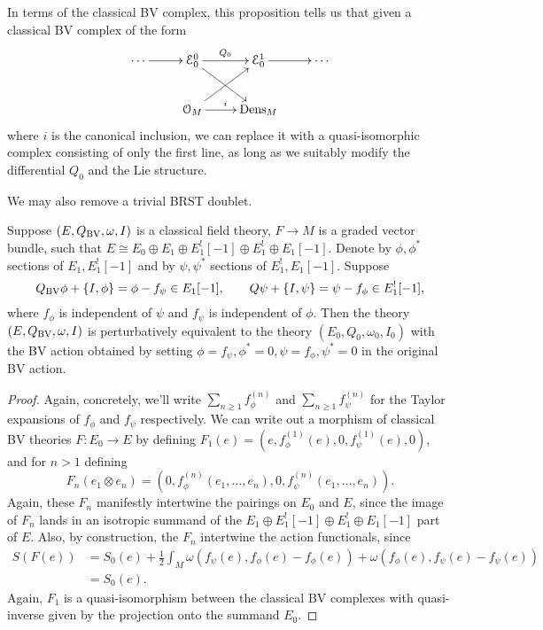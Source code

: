 \documentclass[10pt, oneside]{article}
\begin{document}
\begin{remark}
In terms of the classical BV complex, this proposition tells us that given a classical BV complex of the form
\[\xymatrix{
\cdots \ar[r] &\mc E_0^0 \ar[r]^{Q_0} \ar[dr] &\mc E_0^1 \ar[r] &\cdots \\
&\cO_M \ar^{i}[r] \ar[ur] &\dens_M &
}\]
where $i$ is the canonical inclusion, we can replace it with a quasi-isomorphic complex consisting of only the first line, as long as we suitably modify the differential $Q_0$ and the Lie structure.
\end{remark}

We may also remove a trivial BRST doublet.

\begin{prop}
Suppose $(E, Q_{\mathrm{BV}}, \omega, I)$ is a classical field theory, $F\rightarrow M$ is a graded vector bundle, such that $E\cong E_0\oplus E_1\oplus E_1^![-1]\oplus E_1^!\oplus E_1[-1]$. Denote by $\phi, \phi^*$ sections of $E_1,E_1^![-1]$ and by $\psi, \psi^*$ sections of $E_1^!, E_1[-1]$. Suppose
\[Q_{\mathrm{BV}}\phi + \{I, \phi\} = \phi - f_\psi \in E_1[-1] ,\qquad Q\psi + \{I, \psi\} = \psi - f_{\phi} \in E_1^![-1],\]
where $f_\phi$ is independent of $\psi$ and $f_{\psi}$ is independent of $\phi$. Then the theory $(E, Q_{\mathrm{BV}}, \omega, I)$ is perturbatively equivalent to the theory $(E_0, Q_0, \omega_0, I_0)$ with the BV action obtained by setting $\phi = f_\psi, \phi^* = 0,  \psi = f_\phi, \psi^* = 0$ in the original BV action.
\label{prop:BRSTdoublet}
\end{prop}

\begin{proof}
Again, concretely, we'll write $\sum_{n \ge 1} f^{(n)}_\phi$ and $\sum_{n \ge 1} f^{(n)}_{\psi}$ for the Taylor expansions of $f_\phi$ and $f_{\psi}$ respectively.  We can write out a morphism of classical BV theories $F \colon E_0 \to E$ by defining $F_1(e) = (e, f^{(1)}_{\phi}(e),0,f^{(1)}_\psi(e),0)$, and for $n > 1$ defining 
\[F_n(e_1\otimes e_n) = (0, f^{(n)}_{\phi}(e_1, \ldots, e_n), 0, f^{(n)}_{\psi}(e_1, \ldots, e_n)).\]
Again, these $F_n$ manifestly intertwine the pairings on $E_0$ and $E$, since the image of $F_n$ lands in an isotropic summand of the $E_1\oplus E_1^![-1]\oplus E_1^!\oplus E_1[-1]$ part of $E$.  Also, by construction, the $F_n$ intertwine the action functionals, since
\begin{align*}
S(F(e)) &= S_0(e) + \frac{1}{2} \int_M \omega(f_\psi(e), f_\phi(e) - f_\phi(e)) + \omega(f_\phi(e), f_\psi(e) - f_\psi(e)) \\
&= S_0(e).
\end{align*}
Again, $F_1$ is a quasi-isomorphism between the classical BV complexes with quasi-inverse given by the projection onto the summand $E_0$.
\end{proof}
\end{document}
